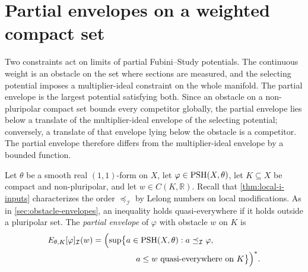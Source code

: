 \section{Partial envelopes on a weighted compact set}
\label{sec:hermitian-partial-envelopes}

Two constraints act on limits of partial Fubini--Study potentials. The continuous weight is an obstacle on the set where sections are measured, and the selecting potential imposes a multiplier-ideal constraint on the whole manifold. The partial envelope is the largest potential satisfying both. Since an obstacle on a non-pluripolar compact set bounds every competitor globally, the partial envelope lies below a translate of the multiplier-ideal envelope of the selecting potential; conversely, a translate of that envelope lying below the obstacle is a competitor. The partial envelope therefore differs from the multiplier-ideal envelope by a bounded function.

Let $\theta$ be a smooth real $(1,1)$-form on $X$, let $\varphi\in\mathrm{PSH}(X,\theta)$, let $K\subseteq X$ be compact and non-pluripolar, and let $w\in C(K,\mathbb R)$. Recall that \cref{thm:local-i-inputs} characterizes the order $\preceq_{\mathcal I}$ by Lelong numbers on local modifications. As in \cref{sec:obstacle-envelopes}, an inequality holds quasi-everywhere if it holds outside a pluripolar set. The \emph{partial envelope} of $\varphi$ with obstacle $w$ on $K$ is
\begin{equation}\label{eq:hermitian-partial-i-envelope}
 \begin{aligned}
 E_{\theta,K}[\varphi]_{\mathcal I}(w)
 &=\Bigl(\sup\bigl\{a\in\mathrm{PSH}(X,\theta):
       a\preceq_{\mathcal I}\varphi,\\
 &\hspace{52pt}a\leq w\text{ quasi-everywhere on }K\bigr\}\Bigr)^*.
 \end{aligned}
\end{equation}

